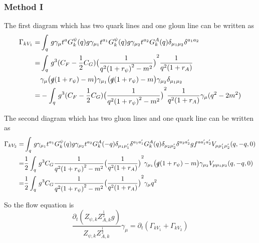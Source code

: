 \documentclass[UTF8]{ctexart}
\begin{document}
\subsubsection{Method I}
\par The first diagram which has two quark lines and one gloun line can be written as 
\begin{align}
\Gamma_{kV_1}=
&\int_{q}\,g\gamma_{\mu}t^{a}G_{k}^{\psi}(q)g\gamma_{\mu_1}t^{a_1}G_{k}^{\psi}(q)g\gamma_{\mu_2}t^{a_2}G_{k}^{A}(q)\delta_{\mu_1 \mu_2}\delta^{a_1 a_2}
\notag\\=&\int_{q}\,g^3 (C_{F}-\frac{1}{2}C_{G}){\big(\frac{1}{q^2{(1+r_{\psi})}^2-m^2}\big)}^{2}\frac{1}{{q}^2 (1+r_A)}
\notag\\&\gamma_{\mu}\big(\slashed{q}(1+r_{\psi})-m\big)\gamma_{\mu_1}\big(\slashed{q}(1+r_{\psi})-m\big)\gamma_{\mu_2}\delta_{\mu_1 \mu_2}
\notag\\=&-\int_{q}\,g^3 (C_{F}-\frac{1}{2}C_{G}){\big(\frac{1}{q^2{(1+r_{\psi})}^2-m^2}\big)}^{2}\frac{1}{{q}^2 (1+r_A)}\gamma_{\mu}(q^{2}-2m^{2})
\end{align}
\par The second diagram which has two gluon lines and one quark line can be written as
\begin{align}
\Gamma_{kV_2}=
&\int_{q}\,g\gamma_{\mu_1}t^{a_1}G_{k}^{\psi}(q)g\gamma_{\mu_2}t^{a_2}G_{k}^{A}(-q)\delta_{\mu_1 \mu_1'}\delta^{a_1 a_1'}G_{k}^{A}(q)\delta_{\mu_2 \mu_2'}\delta^{a_2 a_2'}gf^{a a_1' a_2'}V_{\mu\mu_1' \mu_2'}(q,-q,0)
\notag\\=&\frac{1}{2}\int_{q}\,g^{3}C_{G}\frac{1}{q^2{(1+r_{\psi})}^2-m^2}{\big(\frac{1}{{q}^2 (1+r_A)}\big)}^{2}\gamma_{\mu_1}\big(\slashed{q}(1+r_{\psi})-m\big)\gamma_{\mu_2}V_{\mu\mu_1 \mu_2}(q,-q,0)
\notag\\=&\frac{1}{2}\int_{q}\,g^{3}C_{G}\frac{1}{q^2{(1+r_{\psi})}^2-m^2}{\big(\frac{1}{{q}^2 (1+r_A)}\big)}^{2}\gamma_{\mu}q^{2}
\end{align}
\par So the flow equation is 
\begin{equation}
\frac{\partial_{t}(Z_{\psi,k}Z_{A,k}^{\frac{1}{2}}g)}{Z_{\psi,k}Z_{A,k}^{\frac{1}{2}}}\gamma_{\mu}=\partial_{t}(\Gamma_{kV_1}+\Gamma_{kV_2})
\end{equation}
\end{document}

